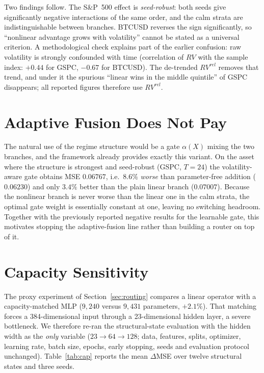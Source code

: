 \documentclass[conference]{IEEEtran}
\begin{document}
Two findings follow. The S\&P~500 effect is \emph{seed-robust}: both seeds give significantly
negative interactions of the same order, and the calm strata are indistinguishable between
branches. BTCUSD reverses the sign significantly, so ``nonlinear advantage grows with volatility''
cannot be stated as a universal criterion. A methodological check explains part of the earlier
confusion: raw volatility is strongly confounded with time (correlation of $RV$ with the sample
index: $+0.44$ for GSPC, $-0.67$ for BTCUSD). The de-trended $RV^{rel}$ removes that trend, and
under it the spurious ``linear wins in the middle quintile'' of GSPC disappears; all reported
figures therefore use $RV^{rel}$.

\section{Adaptive Fusion Does Not Pay}
The natural use of the regime structure would be a gate $\alpha(X)$ mixing the two branches, and
the framework already provides exactly this variant. On the asset where the structure is strongest
and seed-robust (GSPC, $T=24$) the volatility-aware gate obtains MSE $0.06767$, i.e.\ $8.6\%$
\emph{worse} than parameter-free addition ($0.06230$) and only $3.4\%$ better than the plain linear
branch ($0.07007$). Because the nonlinear branch is never worse than the linear one in the calm
strata, the optimal gate weight is essentially constant at one, leaving no switching headroom.
Together with the previously reported negative results for the learnable gate, this motivates
stopping the adaptive-fusion line rather than building a router on top of it.

\section{Capacity Sensitivity}
The proxy experiment of Section~\ref{sec:routing} compares a linear operator with a
capacity-matched MLP ($9{,}240$ versus $9{,}431$ parameters, $+2.1\%$). That matching forces a
384-dimensional input through a 23-dimensional hidden layer, a severe bottleneck. We therefore
re-ran the structural-state evaluation with the hidden width as the \emph{only} variable
($23\to64\to128$; data, features, splits, optimizer, learning rate, batch size, epochs, early
stopping, seeds and evaluation protocol unchanged). Table~\ref{tab:cap} reports the mean
$\Delta$MSE over twelve structural states and three seeds.
\end{document}
